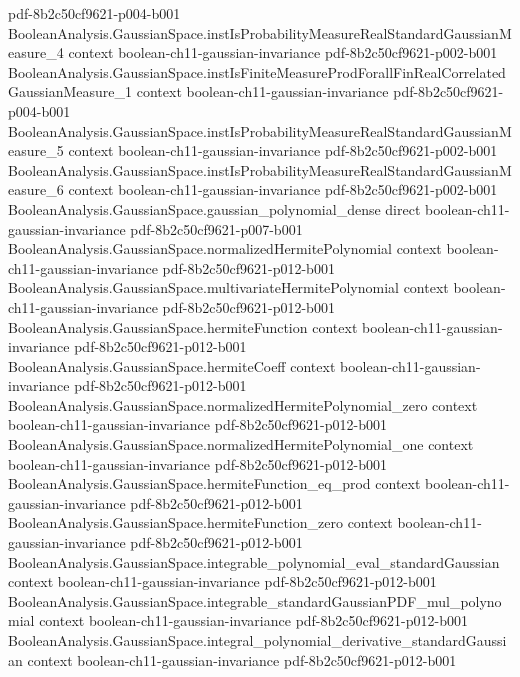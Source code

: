 \begin{lemma}
  {pdf-8b2c50cf9621-p004-b001}
\proofstep
  {BooleanAnalysis.GaussianSpace.instIsProbabilityMeasureRealStandardGaussianMeasure_4}
  {context}
  {boolean-ch11-gaussian-invariance}
  {pdf-8b2c50cf9621-p002-b001}
\proofstep
  {BooleanAnalysis.GaussianSpace.instIsFiniteMeasureProdForallFinRealCorrelatedGaussianMeasure_1}
  {context}
  {boolean-ch11-gaussian-invariance}
  {pdf-8b2c50cf9621-p004-b001}
\proofstep
  {BooleanAnalysis.GaussianSpace.instIsProbabilityMeasureRealStandardGaussianMeasure_5}
  {context}
  {boolean-ch11-gaussian-invariance}
  {pdf-8b2c50cf9621-p002-b001}
\proofstep
  {BooleanAnalysis.GaussianSpace.instIsProbabilityMeasureRealStandardGaussianMeasure_6}
  {context}
  {boolean-ch11-gaussian-invariance}
  {pdf-8b2c50cf9621-p002-b001}
\proofstep
  {BooleanAnalysis.GaussianSpace.gaussian_polynomial_dense}
  {direct}
  {boolean-ch11-gaussian-invariance}
  {pdf-8b2c50cf9621-p007-b001}
\proofstep
  {BooleanAnalysis.GaussianSpace.normalizedHermitePolynomial}
  {context}
  {boolean-ch11-gaussian-invariance}
  {pdf-8b2c50cf9621-p012-b001}
\proofstep
  {BooleanAnalysis.GaussianSpace.multivariateHermitePolynomial}
  {context}
  {boolean-ch11-gaussian-invariance}
  {pdf-8b2c50cf9621-p012-b001}
\proofstep
  {BooleanAnalysis.GaussianSpace.hermiteFunction}
  {context}
  {boolean-ch11-gaussian-invariance}
  {pdf-8b2c50cf9621-p012-b001}
\proofstep
  {BooleanAnalysis.GaussianSpace.hermiteCoeff}
  {context}
  {boolean-ch11-gaussian-invariance}
  {pdf-8b2c50cf9621-p012-b001}
\proofstep
  {BooleanAnalysis.GaussianSpace.normalizedHermitePolynomial_zero}
  {context}
  {boolean-ch11-gaussian-invariance}
  {pdf-8b2c50cf9621-p012-b001}
\proofstep
  {BooleanAnalysis.GaussianSpace.normalizedHermitePolynomial_one}
  {context}
  {boolean-ch11-gaussian-invariance}
  {pdf-8b2c50cf9621-p012-b001}
\proofstep
  {BooleanAnalysis.GaussianSpace.hermiteFunction_eq_prod}
  {context}
  {boolean-ch11-gaussian-invariance}
  {pdf-8b2c50cf9621-p012-b001}
\proofstep
  {BooleanAnalysis.GaussianSpace.hermiteFunction_zero}
  {context}
  {boolean-ch11-gaussian-invariance}
  {pdf-8b2c50cf9621-p012-b001}
\proofstep
  {BooleanAnalysis.GaussianSpace.integrable_polynomial_eval_standardGaussian}
  {context}
  {boolean-ch11-gaussian-invariance}
  {pdf-8b2c50cf9621-p012-b001}
\proofstep
  {BooleanAnalysis.GaussianSpace.integrable_standardGaussianPDF_mul_polynomial}
  {context}
  {boolean-ch11-gaussian-invariance}
  {pdf-8b2c50cf9621-p012-b001}
\proofstep
  {BooleanAnalysis.GaussianSpace.integral_polynomial_derivative_standardGaussian}
  {context}
  {boolean-ch11-gaussian-invariance}
  {pdf-8b2c50cf9621-p012-b001}

\end{lemma}
